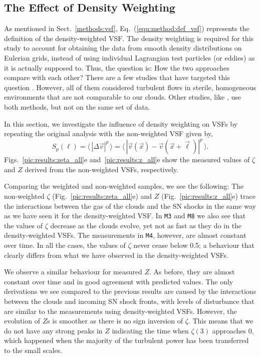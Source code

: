 \subsection{The Effect of Density Weighting}\label{results:densweight}

As mentioned in Sect.~\ref{methods:vsf}, Eq.~(\ref{equ:method:def_vsf}) represents the definition of the density-weighted VSF.
The density weighting is required for this study to account for obtaining the data from smooth density distributions on Eulerian grids, instead of using individual Lagrangian test particles (or eddies) as it is actually supposed to.
Thus, the question is: How the two approaches compare with each other?
There are a few studies that have targeted this question . 
However, all of them considered turbulent flows in sterile, homogeneous environments that are not comparable to our clouds.
Other studies, like \citet{Padoan2016a}, use both methods, but not on the same set of data. 

In this section, we investigate the influence of density weighting on VSFs by repeating the original analysis with the non-weighted VSF given by,
\begin{equation}
	\mathit{S}_p (\ell) = \langle \, |\Delta \vec{v}|^p  \, \rangle = \langle \, |\vec{v}(\vec{x}) - \vec{v}(\vec{x} + \vec{\ell})|^p  \, \rangle .
    \label{equ:results:def_vsf_no}
\end{equation}
Figs.~\ref{pic:results:zeta_all}e and~\ref{pic:results:z_all}e show the measured values of $\zeta$ and $Z$ derived from the non-weighted VSFs, respectively.

Comparing the weighted and non-weighted samples, we see the following:
The non-weighted $\zeta$ (Fig.~\ref{pic:results:zeta_all}e) and $Z$ (Fig.~\ref{pic:results:z_all}e) trace the interactions between the gas of the clouds and the SN shocks in the same way as we have seen it for the density-weighted VSF.
In \texttt{M3} and \texttt{M8} we also see that the values of $\zeta$ decrease as the clouds evolve, yet not as fast as they do in the density-weighted VSFs. 
The measurements in \texttt{M4}, however, are almost constant over time. 
In all the cases, the values of $\zeta$ never cease below 0.5; a behaviour that clearly differs from what we have observed in the density-weighted VSFs.

We observe a similar behaviour for measured $Z$. 
As before, they are almost constant over time and in good agreement with predicted values.
The only derivations we see compared to the previous results are caused by the interactions between the clouds and incoming SN shock fronts, with levels of disturbance that are similar to the measurements using density-weighted VSFs. 
However, the evolution of $Z$s is smoother as there is no sign inversion of $\zeta$.
This means that we do not have any strong peaks in $Z$ indicating the time when $\zeta(3)$ approaches 0, which happened when the majority of the turbulent power has been transferred to the small scales. 

